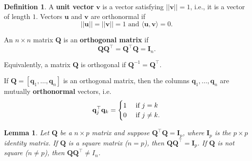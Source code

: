 \documentclass[
]{book}
\newtheorem{lemma}{Lemma}[chapter]
\theoremstyle{definition}
\newtheorem{definition}{Definition}[chapter]
\theoremstyle{definition}
\theoremstyle{definition}
\theoremstyle{definition}
\theoremstyle{remark}
\begin{document}
\begin{definition}
\protect\hypertarget{def:orthogonal}{}\label{def:orthogonal}A \textbf{unit vector} \(\mathbf v\) is a vector satisfying \(||{\mathbf v}||=1\), i.e., it is a vector of length \(1\). Vectors \(\mathbf u\) and \(\mathbf v\) are orthonormal if
\[||\mathbf u||=||\mathbf v|| = 1 \mbox{ and } \langle \mathbf u, \mathbf v\rangle =0.\]

An \(n\times n\) matrix \({\mathbf Q}\) is an \textbf{orthogonal matrix} if \[{\mathbf Q}\mathbf Q^\top = {\mathbf Q}^\top {\mathbf Q}={\mathbf I}_n.\]

Equivalently, a matrix \(\mathbf Q\) is orthogonal if \({\mathbf Q}^{-1}={\mathbf Q}^\top.\)

If \({\mathbf Q}=[\mathbf q_1,\ldots, \mathbf q_n]\) is an orthogonal matrix, then the columns \(\mathbf q_1, \ldots, \mathbf q_n\) are mutually \textbf{orthonormal} vectors, i.e.
\[
\mathbf q_j^\top \mathbf q_k=\begin{cases} 1 &\hbox{ if }  j=k\\
0 &\hbox{ if }   j \neq k. \\
\end{cases}
\]
\end{definition}

\begin{lemma}
\protect\hypertarget{lem:lemorthog}{}\label{lem:lemorthog}Let \(\mathbf Q\) be a \(n\times p\) matrix and suppose \(\mathbf Q^\top \mathbf Q=\mathbf I_p\), where \(\mathbf I_p\) is the \(p \times p\) identity matrix. If \(\mathbf Q\) is a square matrix (\(n=p\)), then \(\mathbf Q\mathbf Q^\top = \mathbf I_p\). If \(\mathbf Q\) is not square (\(n\not =p\)), then \(\mathbf Q\mathbf Q^\top \not = I_n\).
\end{lemma}
\end{document}
